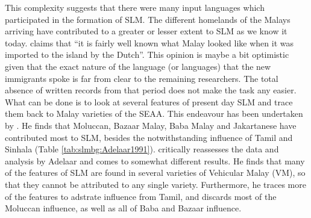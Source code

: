 This complexity suggests that there were many input languages which participated in the formation of SLM. The
different homelands of the Malays arriving have contributed to a
greater or lesser extent to SLM as we know it today. \citet{Bakker1996stuf,Bakker2006} claims that  ``it is fairly well known what Malay looked like  when it was imported to the island by the Dutch''. This opinion is maybe a bit optimistic given that the exact nature of the language (or languages) that the new immigrants spoke is far from clear to the remaining researchers. The total absence of written records from that period does not make the task any easier.
 What can be done is to look at
several features of present day SLM and trace them back to Malay
varieties of the SEAA. This endeavour has been undertaken by
\citet{Adelaar1991}.
He finds that Moluccan, Bazaar Malay, Baba
Malay and Jakartanese have contributed most to SLM, besides the notwithstanding influence of Tamil and Sinhala (Table \ref{tab:slmbg:Adelaar1991}). \citet{Paauw2004} critically reassesses the data and analysis by Adelaar and comes to somewhat different results. He finds that many of the features of SLM are found in several varieties of Vehicular Malay (VM), so that they cannot be attributed to any single variety. Furthermore, he traces more of the features to adstrate influence from Tamil, and discards most of the Moluccan influence, as well as all of Baba and Bazaar influence.


